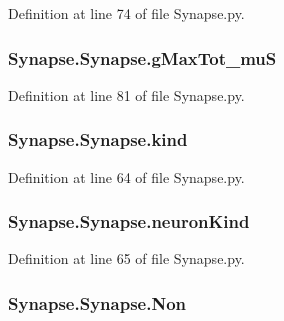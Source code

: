 Definition at line 74 of file Synapse.\-py.

\hypertarget{class_synapse_1_1_synapse_a470750725ecb176e048a973b9dc23ea3}{
\subsubsection[{g\-Max\-Tot\-\_\-mu\-S}]{\setlength{\rightskip}{0pt plus 5cm}Synapse.\-Synapse.\-g\-Max\-Tot\-\_\-mu\-S}}\label{class_synapse_1_1_synapse_a470750725ecb176e048a973b9dc23ea3}


Definition at line 81 of file Synapse.\-py.

\hypertarget{class_synapse_1_1_synapse_aa2ea45450a3ad13cfefcae9fabe6ce15}{
\subsubsection[{kind}]{\setlength{\rightskip}{0pt plus 5cm}Synapse.\-Synapse.\-kind}}\label{class_synapse_1_1_synapse_aa2ea45450a3ad13cfefcae9fabe6ce15}


Definition at line 64 of file Synapse.\-py.

\hypertarget{class_synapse_1_1_synapse_a031af2fe7be76f9b5f69c087228a1b9a}{
\subsubsection[{neuron\-Kind}]{\setlength{\rightskip}{0pt plus 5cm}Synapse.\-Synapse.\-neuron\-Kind}}\label{class_synapse_1_1_synapse_a031af2fe7be76f9b5f69c087228a1b9a}


Definition at line 65 of file Synapse.\-py.

\hypertarget{class_synapse_1_1_synapse_af8779bbc2ee2c5ae7747ee5cfbcf112e}{
\subsubsection[{Non}]{\setlength{\rightskip}{0pt plus 5cm}Synapse.\-Synapse.\-Non}}\label{class_synapse_1_1_synapse_af8779bbc2ee2c5ae7747ee5cfbcf112e}


